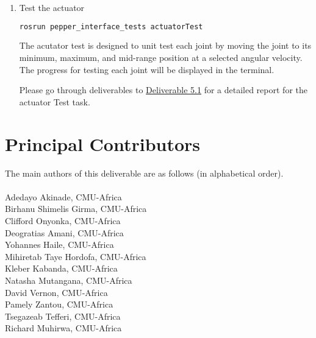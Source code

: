 \documentclass{CSSRforAfrica}
\newcommand{\blank}{~\\}
\begin{document}
{\begin{enumerate}
			\item Test the actuator
			\begin{lstlisting}[style=withoutNumbering, language=bash]
			rosrun pepper_interface_tests actuatorTest
			\end{lstlisting}
			
			The acutator test is designed to unit test each joint by moving the joint to its minimum, maximum, and mid-range position at a selected angular velocity. The progress for testing each joint will be displayed in the terminal. 
			
			Please go through deliverables to \href{https://cssr4africa.github.io/deliverables/CSSR4Africa_Deliverable_D5.1.pdf}
			{Deliverable 5.1} for a detailed report for the actuator Test task.
			
		\end{enumerate}
		
		\newpage
		
		
		\newpage
		
		\section*{Principal Contributors}
		\label{contributors}
		The main authors of this deliverable are as follows (in alphabetical order).
		\blank
		~
		\blank
		Adedayo Akinade, CMU-Africa\\          %
		Birhanu Shimelis Girma, CMU-Africa\\
		Clifford Onyonka, CMU-Africa\\
		Deogratias Amani, CMU-Africa\\  
		Yohannes Haile, CMU-Africa\\ 
		Mihiretab Taye Hordofa, CMU-Africa\\ 
		Kleber Kabanda, CMU-Africa\\
		Natasha Mutangana, CMU-Africa\\ 
		David Vernon, CMU-Africa\\
		Pamely Zantou, CMU-Africa\\
		Tsegazeab Tefferi, CMU-Africa\\
		Richard Muhirwa, CMU-Africa\\
		
}
\end{document}
